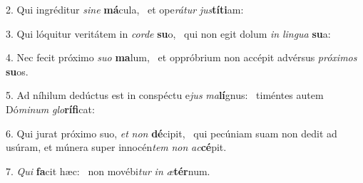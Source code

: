 2. Qui ingréditur \textit{si}\textit{ne} \textbf{má}cula, \ast\  et ope\textit{rá}\textit{tur} \textit{jus}\textbf{tí}\textbf{ti}am:\

3. Qui lóquitur veritátem in \textit{cor}\textit{de} \textbf{su}o, \ast\  qui non egit dolum \textit{in} \textit{lin}\textit{gua} \textbf{su}a:\

4. Nec fecit próximo \textit{su}\textit{o} \textbf{ma}lum, \ast\  et oppróbrium non accépit advérsus \textit{pró}\textit{xi}\textit{mos} \textbf{su}os.\

5. Ad níhilum dedúctus est in conspéctu e\textit{jus} \textit{ma}\textbf{lí}gnus: \ast\  timéntes autem Dó\textit{mi}\textit{num} \textit{glo}\textbf{rí}\textbf{fi}cat:\

6. Qui jurat próximo suo, \textit{et} \textit{non} \textbf{dé}cipit, \ast\  qui pecúniam suam non dedit ad usúram, et múnera super innocén\textit{tem} \textit{non} \textit{ac}\textbf{cé}pit.\

7. \textit{Qui} \textbf{fa}cit hæc: \ast\  non movébi\textit{tur} \textit{in} \textit{æ}\textbf{tér}num.\

